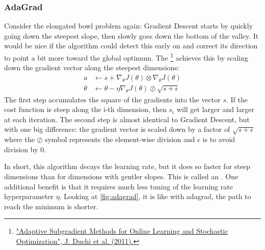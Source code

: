 \subsubsection{AdaGrad}
Consider the elongated bowl problem again: Gradient Descent starts by quickly going down the steepest slope, then slowly goes down the bottom of the valley. It would be nice if the algorithm could detect this early on and correct its direction to point a bit more toward the global optimum. The \footnote{\href{https://homl.info/56}{"Adaptive Subgradient Methods for Online Learning and Stochastic Optimization", J. Duchi et al. (2011).}} achieves this by scaling down the gradient vector along the steepest dimensions:
\begin{equation}
\begin{aligned}
a &\leftarrow s + \nabla_\theta J(\theta) \otimes \nabla_\theta J(\theta)\\
\theta &\leftarrow \theta - \eta  \nabla_\theta J(\theta) \oslash \sqrt{s+\epsilon}
\end{aligned}
\end{equation}
The first step accumulates the square of the gradients into the vector $s$. If the cost function is steep along the i-th dimension, then $s_i$ will get larger and larger at each iteration. The second step is almost identical to Gradient Descent, but with one big difference: the gradient vector is scaled down by a factor of $\sqrt{s+\epsilon}$ where the $\oslash$ symbol represents the element-wise division and $\epsilon$ is to avoid division by $0$.

In short, this algorithm decays the learning rate, but it does so faster for steep dimensions than for dimensions with gentler slopes. This is called an . One additional benefit is that it requires much less tuning of the learning rate hyperparameter $\eta$. Looking at \autoref{fig:adagrad}, it is like with adagrad, the path to reach the minimum is shorter.

